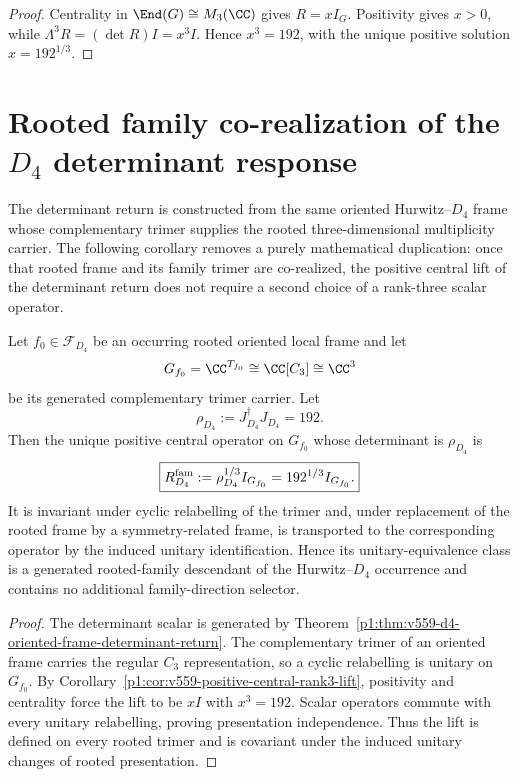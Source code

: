 \documentclass[11pt]{article}
\begin{document}
\begin{proof}
Centrality in \(\End(G)\cong M_3(\CC)\) gives \(R=xI_G\).  Positivity gives
\(x>0\), while \(\Lambda^3R=(\det R)I=x^3I\).  Hence \(x^3=192\), with the
unique positive solution \(x=192^{1/3}\).
\end{proof}

\section{Rooted family co-realization of the \texorpdfstring{\(D_4\)}{D4} determinant response}
\label{p1:sec:v560-d4-rooted-family-corealization}

The determinant return is constructed from the same oriented
Hurwitz--\(D_4\) frame whose complementary trimer supplies the rooted
three-dimensional multiplicity carrier.  The following corollary removes a
purely mathematical duplication: once that rooted frame and its family trimer
are co-realized, the positive central lift of the determinant return does not
require a second choice of a rank-three scalar operator.

\begin{corollary}
\label{p1:cor:v560-frame-independent-family-lift}
Let \(f_0\in\mathcal F_{D_4}\) be an occurring rooted oriented local frame and
let
\[
 G_{f_0}=\CC^{T_{f_0}}\cong\CC[C_3]\cong\CC^3
\]
be its generated complementary trimer carrier.  Let
\[
 \rho_{D_4}:=J_{D_4}^{\dagger}J_{D_4}=192.
\]
Then the unique positive central operator on \(G_{f_0}\) whose determinant is
\(\rho_{D_4}\) is
\[
 \boxed{R_{D_4}^{\rm fam}:=\rho_{D_4}^{1/3}I_{G_{f_0}}
       =192^{1/3}I_{G_{f_0}}.}
\]
It is invariant under cyclic relabelling of the trimer and, under replacement
of the rooted frame by a symmetry-related frame, is transported to the
corresponding operator by the induced unitary identification.  Hence its
unitary-equivalence class is a generated rooted-family descendant of the
Hurwitz--\(D_4\) occurrence and contains no additional family-direction
selector.
\end{corollary}

\begin{proof}
The determinant scalar is generated by
Theorem~\ref{p1:thm:v559-d4-oriented-frame-determinant-return}.  The
complementary trimer of an oriented frame carries the regular \(C_3\)
representation, so a cyclic relabelling is unitary on \(G_{f_0}\).  By
Corollary~\ref{p1:cor:v559-positive-central-rank3-lift}, positivity and
centrality force the lift to be \(xI\) with \(x^3=192\).  Scalar operators
commute with every unitary relabelling, proving presentation independence.
Thus the lift is defined on every rooted trimer and is covariant under
the induced unitary changes of rooted presentation.
\end{proof}
\end{document}
